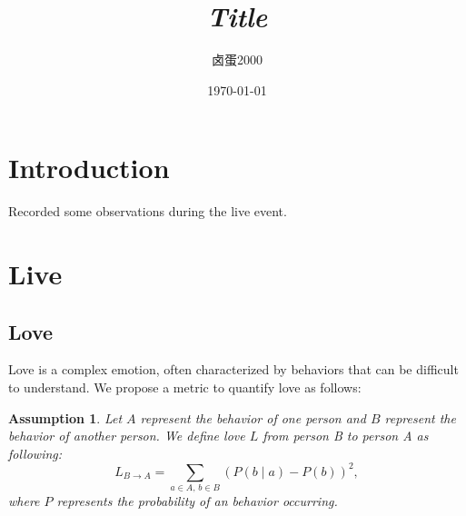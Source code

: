 \documentclass{article}
\title{\textit{Title}}
\author{卤蛋2000}
\date{\today}
\newtheorem{assumption}{Assumption}
\begin{document}
\maketitle

\section{Introduction}
Recorded some observations during the live event.

\section{Live}
\subsection{Love}
Love is a complex emotion, often characterized by behaviors that can be difficult to understand. We propose a metric to quantify love as follows:

\begin{assumption}
    Let $A$ represent the behavior of one person and $B$ represent the behavior of another person. We define love $L$ from person B to person A as following:
    \begin{equation}
        L_{B\to A}=\sum_{a\in A,\, b\in B}(P(b\mid a)-P(b))^2,
    \end{equation}
    where $P$ represents the probability of an behavior occurring.
\end{assumption}
\end{document}
